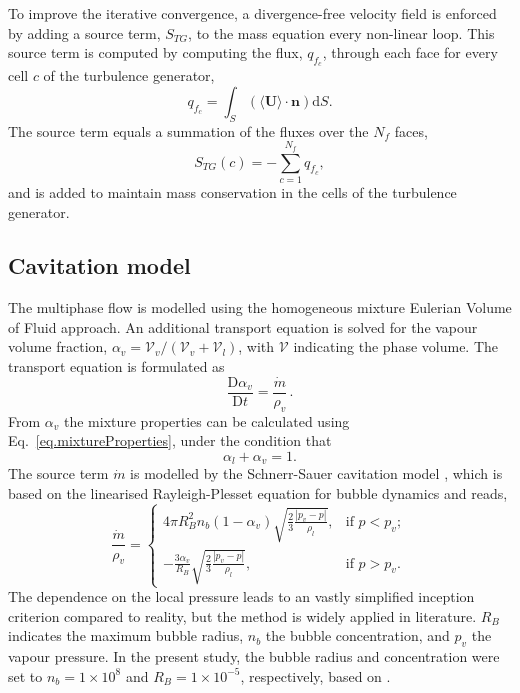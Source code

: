 \documentclass[a4paper,10pt,preprint,3p]{elsarticle}
\begin{document}
To improve the iterative convergence, a divergence-free velocity field is enforced by adding a source term, $S_{TG}$, to the mass equation every non-linear loop. This source term is computed by computing the flux, $q_{f_c}$, through each face for every cell $c$ of the turbulence generator,
\begin{equation}\label{eq.TG_sourceTermCorrection}
q_{f_c} = \int_S \left( \langle \mathbf{U} \rangle \cdot \mathbf{n} \right) \mathrm{d} S.
\end{equation}
The source term equals a summation of the fluxes over the $N_f$ faces,
\begin{equation}
S_{TG}(c) = - \sum\limits_{c = 1}^{N_f} q_{f_c},
\end{equation}
and is added to maintain mass conservation in the cells of the turbulence generator.










\subsection{Cavitation model}
\label{sec.cavitationModel}
The multiphase flow is modelled using the homogeneous mixture Eulerian Volume of Fluid approach. An additional transport equation is solved for the vapour volume fraction, $\alpha_v=\mathcal{V}_v/(\mathcal{V}_v+\mathcal{V}_l)$, with $\mathcal{V}$ indicating the phase volume. The transport equation is formulated as
\begin{equation}
\frac{\mathrm{D} \alpha_{v}}{\mathrm{D}t}=\frac{\dot{m}}{\rho_{v}}\,.
\end{equation}
From $\alpha_v$ the mixture properties can be calculated using Eq.~\ref{eq.mixtureProperties}, under the condition that
\begin{equation}
\alpha_l + \alpha_v = 1.
\end{equation}
The source term $\dot{m}$ is modelled by the Schnerr-Sauer cavitation model \cite{schnerr2001physical,hoekstra2009partial}, which is based on the linearised Rayleigh-Plesset equation for bubble dynamics and reads,
\begin{equation}
  \frac{\dot{m}}{\rho_v} =
  \begin{cases}
   4\pi R_B^2n_b(1-\alpha_v)\sqrt{\frac{2}{3}\frac{|p_v-p|}{\rho_l}}, & \text{if } p<p_v; \\
   -\frac{3\alpha_v}{R_B}\sqrt{\frac{2}{3}\frac{|p_v-p|}{\rho_l}},    & \text{if } p>p_v.
  \end{cases}
\end{equation}
The dependence on the local pressure leads to an vastly simplified inception criterion compared to reality, but the method is widely applied in literature. $R_B$ indicates the maximum bubble radius, $n_b$ the bubble concentration, and $p_v$ the vapour pressure. In the present study, the bubble radius and concentration were set to $n_b =1 \times 10^8$ and $R_B = 1 \times 10^{-5}$, respectively, based on \cite{vaz2017improved}.








\footnotesize
\setlength{\bibsep}{0pt plus 0.3ex}








\end{document}
